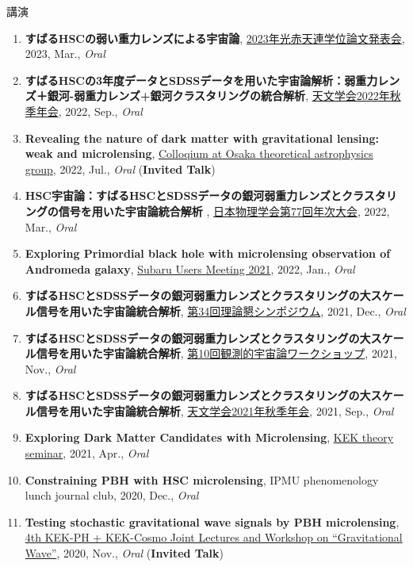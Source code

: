 \begin{rSection}{講演}
\begin{enumerate}
\item \textbf{すばるHSCの弱い重力レンズによる宇宙論}, \href{http://gopira.jp/Dthesis2022/program.html}{2023年光赤天連学位論文発表会}, 2023, Mar., \textit{Oral}
\item \textbf{すばるHSCの3年度データとSDSSデータを用いた宇宙論解析：弱重力レンズ＋銀河-弱重力レンズ+銀河クラスタリングの統合解析}, \href{https://www.asj.or.jp/nenkai/archive/2022b/pdf/U15a.pdf}{天文学会2022年秋季年会}, 2022, Sep., \textit{Oral}
\item \textbf{Revealing the nature of dark matter with gravitational lensing: weak and microlensing}, \href{http://astro-osaka.jp/OUTAP/colloquium-abstracts.html#sugiyama}{Colloqium at Osaka theoretical astrophysics group}, 2022, Jul., \textit{Oral} (\textbf{Invited Talk})
\item \textbf{HSC宇宙論：すばるHSCとSDSSデータの銀河弱重力レンズとクラスタリングの信号を用いた宇宙論統合解析 }, \href{https://www.jps.or.jp/activities/meetings/annual/annual-index.php}{日本物理学会第77回年次大会}, 2022, Mar., \textit{Oral}
\item \textbf{Exploring Primordial black hole with microlensing observation of Andromeda galaxy}, \href{https://subarutelescope.org/Science/SubaruUM/SubaruUM2021/}{Subaru Users Meeting 2021}, 2022, Jan., \textit{Oral}
\item \textbf{すばるHSCとSDSSデータの銀河弱重力レンズとクラスタリングの大スケール信号を用いた宇宙論統合解析}, \href{https://sites.google.com/view/rironkon2021/}{第34回理論懇シンポジウム}, 2021, Dec., \textit{Oral}
\item \textbf{すばるHSCとSDSSデータの銀河弱重力レンズとクラスタリングの大スケール信号を用いた宇宙論統合解析}, \href{https://sites.google.com/view/obscosmws2021main}{第10回観測的宇宙論ワークショップ}, 2021, Nov., \textit{Oral}
\item \textbf{すばるHSCとSDSSデータの銀河弱重力レンズとクラスタリングの大スケール信号を用いた宇宙論統合解析}, \href{https://www.asj.or.jp/nenkai/archive/2021b/pdf/U05a.pdf}{天文学会2021年秋季年会}, 2021, Sep., \textit{Oral}
\item \textbf{Exploring Dark Matter Candidates with Microlensing}, \href{https://www.kek.jp/ja/conference/20210407-3/}{KEK theory seminar}, 2021, Apr., \textit{Oral}
\item \textbf{Constraining PBH with HSC microlensing}, IPMU phenomenology lunch journal club, 2020, Dec., \textit{Oral}
\item \textbf{Testing stochastic gravitational wave signals by PBH microlensing}, \href{http://conference-indico.kek.jp/event/117/timetable/#day-2020-11-04}{4th KEK-PH + KEK-Cosmo Joint Lectures and Workshop on ``Gravitational Wave''}, 2020, Nov., \textit{Oral} (\textbf{Invited Talk})

\end{enumerate}
\end{rSection}
